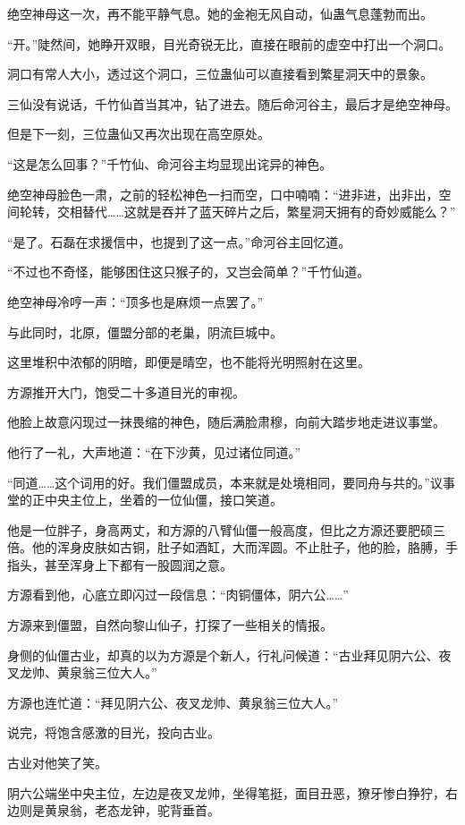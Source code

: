 \begin{this_body}
绝空神母这一次，再不能平静气息。她的金袍无风自动，仙蛊气息蓬勃而出。

“开。”陡然间，她睁开双眼，目光奇锐无比，直接在眼前的虚空中打出一个洞口。

洞口有常人大小，透过这个洞口，三位蛊仙可以直接看到繁星洞天中的景象。

三仙没有说话，千竹仙首当其冲，钻了进去。随后命河谷主，最后才是绝空神母。

但是下一刻，三位蛊仙又再次出现在高空原处。

“这是怎么回事？”千竹仙、命河谷主均显现出诧异的神色。

绝空神母脸色一肃，之前的轻松神色一扫而空，口中喃喃：“进非进，出非出，空间轮转，交相替代……这就是吞并了蓝天碎片之后，繁星洞天拥有的奇妙威能么？”

“是了。石磊在求援信中，也提到了这一点。”命河谷主回忆道。

“不过也不奇怪，能够困住这只猴子的，又岂会简单？”千竹仙道。

绝空神母冷哼一声：“顶多也是麻烦一点罢了。”

与此同时，北原，僵盟分部的老巢，阴流巨城中。

这里堆积中浓郁的阴暗，即便是晴空，也不能将光明照射在这里。

方源推开大门，饱受二十多道目光的审视。

他脸上故意闪现过一抹畏缩的神色，随后满脸肃穆，向前大踏步地走进议事堂。

他行了一礼，大声地道：“在下沙黄，见过诸位同道。”

“同道……这个词用的好。我们僵盟成员，本来就是处境相同，要同舟与共的。”议事堂的正中央主位上，坐着的一位仙僵，接口笑道。

他是一位胖子，身高两丈，和方源的八臂仙僵一般高度，但比之方源还要肥硕三倍。他的浑身皮肤如古铜，肚子如酒缸，大而浑圆。不止肚子，他的脸，胳膊，手指头，甚至浑身上下都有一股圆润之意。

方源看到他，心底立即闪过一段信息：“肉铜僵体，阴六公……”

方源来到僵盟，自然向黎山仙子，打探了一些相关的情报。

身侧的仙僵古业，却真的以为方源是个新人，行礼问候道：“古业拜见阴六公、夜叉龙帅、黄泉翁三位大人。”

方源也连忙道：“拜见阴六公、夜叉龙帅、黄泉翁三位大人。”

说完，将饱含感激的目光，投向古业。

古业对他笑了笑。

阴六公端坐中央主位，左边是夜叉龙帅，坐得笔挺，面目丑恶，獠牙惨白狰狞，右边则是黄泉翁，老态龙钟，驼背垂首。


\end{this_body}
